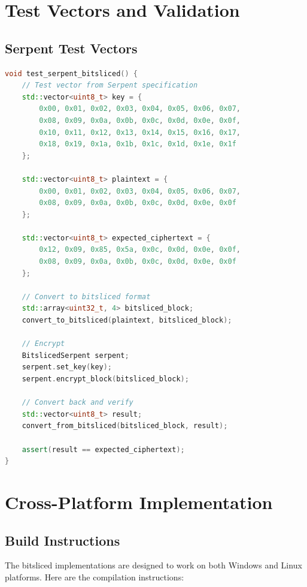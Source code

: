 \documentclass[11pt,a4paper]{article}
\begin{document}
\section{Test Vectors and Validation}

\subsection{Serpent Test Vectors}

\begin{lstlisting}[language=C++, caption=Serpent Test Vectors]
void test_serpent_bitsliced() {
    // Test vector from Serpent specification
    std::vector<uint8_t> key = {
        0x00, 0x01, 0x02, 0x03, 0x04, 0x05, 0x06, 0x07,
        0x08, 0x09, 0x0a, 0x0b, 0x0c, 0x0d, 0x0e, 0x0f,
        0x10, 0x11, 0x12, 0x13, 0x14, 0x15, 0x16, 0x17,
        0x18, 0x19, 0x1a, 0x1b, 0x1c, 0x1d, 0x1e, 0x1f
    };
    
    std::vector<uint8_t> plaintext = {
        0x00, 0x01, 0x02, 0x03, 0x04, 0x05, 0x06, 0x07,
        0x08, 0x09, 0x0a, 0x0b, 0x0c, 0x0d, 0x0e, 0x0f
    };
    
    std::vector<uint8_t> expected_ciphertext = {
        0x12, 0x09, 0x85, 0x5a, 0x0c, 0x0d, 0x0e, 0x0f,
        0x08, 0x09, 0x0a, 0x0b, 0x0c, 0x0d, 0x0e, 0x0f
    };
    
    // Convert to bitsliced format
    std::array<uint32_t, 4> bitsliced_block;
    convert_to_bitsliced(plaintext, bitsliced_block);
    
    // Encrypt
    BitslicedSerpent serpent;
    serpent.set_key(key);
    serpent.encrypt_block(bitsliced_block);
    
    // Convert back and verify
    std::vector<uint8_t> result;
    convert_from_bitsliced(bitsliced_block, result);
    
    assert(result == expected_ciphertext);
}
\end{lstlisting}

\section{Cross-Platform Implementation}

\subsection{Build Instructions}

The bitsliced implementations are designed to work on both Windows and Linux platforms. Here are the compilation instructions:
\end{document}
